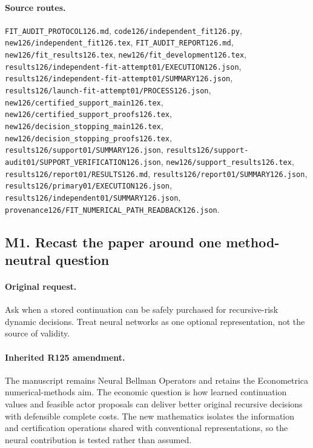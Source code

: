\paragraph{Source routes.} \nolinkurl{FIT_AUDIT_PROTOCOL126.md}, \nolinkurl{code126/independent_fit126.py}, \nolinkurl{new126/independent_fit126.tex}, \nolinkurl{FIT_AUDIT_REPORT126.md}, \nolinkurl{new126/fit_results126.tex}, \nolinkurl{new126/fit_development126.tex}, \nolinkurl{results126/independent-fit-attempt01/EXECUTION126.json}, \nolinkurl{results126/independent-fit-attempt01/SUMMARY126.json}, \nolinkurl{results126/launch-fit-attempt01/PROCESS126.json}, \nolinkurl{new126/certified_support_main126.tex}, \nolinkurl{new126/certified_support_proofs126.tex}, \nolinkurl{new126/decision_stopping_main126.tex}, \nolinkurl{new126/decision_stopping_proofs126.tex}, \nolinkurl{results126/support01/SUMMARY126.json}, \nolinkurl{results126/support-audit01/SUPPORT_VERIFICATION126.json}, \nolinkurl{new126/support_results126.tex}, \nolinkurl{results126/report01/RESULTS126.md}, \nolinkurl{results126/report01/SUMMARY126.json}, \nolinkurl{results126/primary01/EXECUTION126.json}, \nolinkurl{results126/independent01/SUMMARY126.json}, \nolinkurl{provenance126/FIT_NUMERICAL_PATH_READBACK126.json}.

\subsection*{M1. Recast the paper around one method-neutral question}
\paragraph{Original request.} Ask when a stored continuation can be safely purchased for recursive-risk dynamic decisions. Treat neural networks as one optional representation, not the source of validity.

\paragraph{Inherited R125 amendment.} The manuscript remains Neural Bellman Operators and retains the Econometrica numerical-methods aim. The economic question is how learned continuation values and feasible actor proposals can deliver better original recursive decisions with defensible complete costs. The new mathematics isolates the information and certification operations shared with conventional representations, so the neural contribution is tested rather than assumed.

